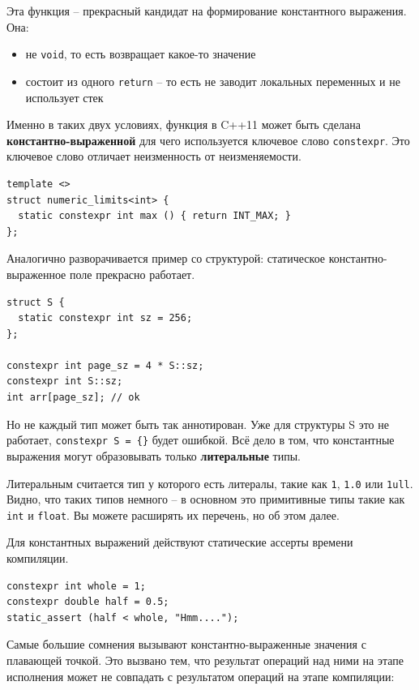 \documentclass[a4paper,12pt,oneside]{book}
\begin{document}
Эта функция -- прекрасный кандидат на формирование константного выражения. Она:
\begin{itemize}
\item не \lstinline!void!, то есть возвращает какое-то значение
\item состоит из одного \lstinline!return! -- то есть не заводит локальных переменных и не использует стек
\end{itemize}

Именно в таких двух условиях, функция в C++11 может быть сделана \textbf{константно-выраженной} для чего используется ключевое слово \lstinline!constexpr!. Это ключевое слово отличает неизменность от неизменяемости.

\begin{lstlisting}
template <>
struct numeric_limits<int> {
  static constexpr int max () { return INT_MAX; }
};
\end{lstlisting}

Аналогично разворачивается пример со структурой: статическое константно-выраженное поле прекрасно работает.

\begin{lstlisting}
struct S { 
  static constexpr int sz = 256; 
};

constexpr int page_sz = 4 * S::sz;
constexpr int S::sz;
int arr[page_sz]; // ok
\end{lstlisting}

Но не каждый тип может быть так аннотирован. Уже для структуры S это не работает, \lstinline!constexpr S = {}! будет ошибкой. Всё дело в том, что константные выражения могут образовывать только \textbf{литеральные} типы.

Литеральным считается тип у которого есть литералы, такие как \lstinline!1!, \lstinline!1.0! или \lstinline!1ull!. Видно, что таких типов немного -- в основном это примитивные типы такие как \lstinline!int! и \lstinline!float!. Вы можете расширять их перечень, но об этом далее.

Для константных выражений действуют статические ассерты времени компиляции.

\begin{lstlisting}
constexpr int whole = 1; 
constexpr double half = 0.5;
static_assert (half < whole, "Hmm....");
\end{lstlisting}

Самые большие сомнения вызывают константно-выраженные значения с плавающей точкой. Это вызвано тем, что результат операций над ними на этапе исполнения может не совпадать с результатом операций на этапе компиляции:
\end{document}
